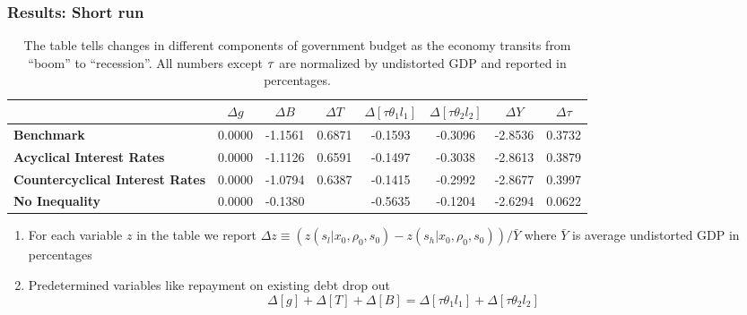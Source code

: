 \documentclass{beamer}
\begin{document}
 \begin{frame}
 \frametitle{Results: Short run}
 {\tiny
\begin{table}[tbp]
\begin{tabular}{|l|c|c|c|c|c|c|c|}
\hline
& \textbf{$\Delta g$} & \textbf{$\Delta B$} & \textbf{$\Delta T$} & \textbf{$%
\Delta [\tau\theta_1l_1]$} & \textbf{$\Delta [\tau\theta_2l_2]$} & \textbf{$%
\Delta Y$} & \textbf{$\Delta \tau$} \\ \hline
\textbf{Benchmark} & 0.0000 & -1.1561 & 0.6871 & -0.1593 & -0.3096 & -2.8536
& 0.3732 \\ \hline
\textbf{Acyclical Interest Rates} & 0.0000 & -1.1126 & 0.6591 & -0.1497 &
-0.3038 & -2.8613 & 0.3879 \\ \hline
\textbf{Countercyclical Interest Rates} & 0.0000 & -1.0794 & 0.6387 & -0.1415 &
-0.2992 & -2.8677 & 0.3997 \\ \hline
\textbf{No Inequality} & 0.0000 & -0.1380 &\color{red}{\textbf{ -0.5459}} & -0.5635 & -0.1204 &
-2.6294 & 0.0622 \\ \hline

\end{tabular}%

\caption{The table tells changes in different components of  government budget as the economy transits from ``boom'' to  ``recession''.  All numbers except $\protect\tau $ are normalized by undistorted GDP  and reported in percentages.
}

\label{tab:ShortRunPolicyResponses}
\end{table}
}
\begin{enumerate}
 \item For each variable
$z$ in the table we report  $\Delta z\equiv \left( z\left(
s_l|x_0,\rho_0,s_0\right) -z\left( s_h|x_0,\rho_0,s_0\right) \right) /\bar{Y}
$ where $\bar{Y}$ is average undistorted GDP in percentages
\item Predetermined variables like repayment on existing debt drop out
\begin{equation*}
\Delta [g]+\Delta[T]+ \Delta [B]=\Delta[\tau \theta_1 l_1]+ \Delta[\tau
\theta_2 l_2]
\end{equation*}%

\end{enumerate}

\small

 \end{frame}
\end{document}
